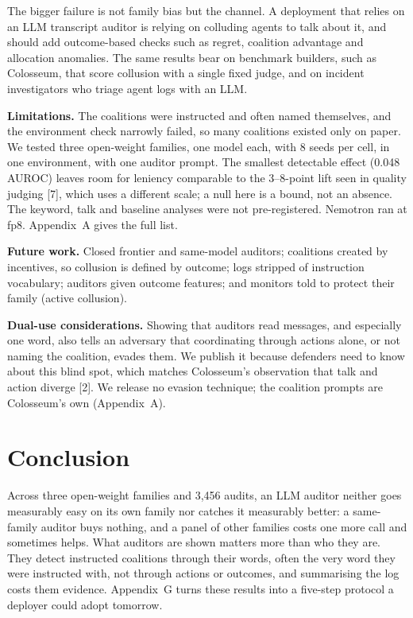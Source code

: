 \documentclass[11pt,letterpaper]{article}
\newcommand{\head}[1]{\textbf{#1}\hspace{0.3em}}
\begin{document}
The bigger failure is not family bias but the channel. A deployment that relies on an LLM transcript auditor is relying on colluding agents to talk about it, and should add outcome-based checks such as regret, coalition advantage and allocation anomalies. The same results bear on benchmark builders, such as Colosseum, that score collusion with a single fixed judge, and on incident investigators who triage agent logs with an LLM.

\head{Limitations.} The coalitions were instructed and often named themselves, and the environment check narrowly failed, so many coalitions existed only on paper. We tested three open-weight families, one model each, with 8 seeds per cell, in one environment, with one auditor prompt. The smallest detectable effect (0.048 AUROC) leaves room for leniency comparable to the 3--8-point lift seen in quality judging [7], which uses a different scale; a null here is a bound, not an absence. The keyword, talk and baseline analyses were not pre-registered. Nemotron ran at fp8. Appendix~A gives the full list.

\head{Future work.} Closed frontier and same-model auditors; coalitions created by incentives, so collusion is defined by outcome; logs stripped of instruction vocabulary; auditors given outcome features; and monitors told to protect their family (active collusion).

\head{Dual-use considerations.} Showing that auditors read messages, and especially one word, also tells an adversary that coordinating through actions alone, or not naming the coalition, evades them. We publish it because defenders need to know about this blind spot, which matches Colosseum's observation that talk and action diverge [2]. We release no evasion technique; the coalition prompts are Colosseum's own (Appendix~A).

\section{Conclusion}

Across three open-weight families and 3,456 audits, an LLM auditor neither goes measurably easy on its own family nor catches it measurably better: a same-family auditor buys nothing, and a panel of other families costs one more call and sometimes helps. What auditors are shown matters more than who they are. They detect instructed coalitions through their words, often the very word they were instructed with, not through actions or outcomes, and summarising the log costs them evidence. Appendix~G turns these results into a five-step protocol a deployer could adopt tomorrow.
\end{document}
